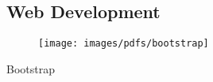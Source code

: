 \begin{aside}
    \subsection{Web Development}
      \begin{center}
        \begin{minipage}[t]{12mm}
          \begin{center}
            \begin{figure}
              \texttt{[image: images/pdfs/bootstrap]}
            \end{figure}
            \small{Bootstrap}
          \end{center}
        \end{minipage}%
      \end{center}
\end{aside}
